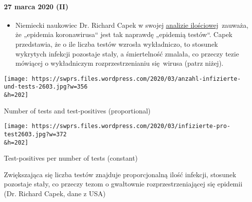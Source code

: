 \hypertarget{27-marca-2020-ii}{%
\paragraph{27 marca 2020 (II)}\label{27-marca-2020-ii}}

\begin{itemize}
\tightlist
\item
  Niemiecki naukowiec Dr. Richard Capek w swojej
  \href{https://coronadaten.wordpress.com/}{analizie
  ilościowej}~zauważa, że „epidemia koronawirusa`` jest tak naprawdę
  „epidemią testów``. Capek przedstawia, że o ile liczba testów wzrosła
  wykładniczo, to stosunek wykrytych infekcji pozostaje stały, a
  śmiertelność zmalała, co przeczy tezie mówiącej o wykładniczym
  rozprzestrzenianiu się~wirusa (patrz niżej).
\end{itemize}

\href{https://swprs.org/a-swiss-doctor-on-covid-19/anzahl-infizierte-und-tests-2603/}{}

\texttt{[image: https://swprs.files.wordpress.com/2020/03/anzahl-infizierte-und-tests-2603.jpg?w=356\\\&h=202]}

Number of tests and test-positives (proportional)

\href{https://swprs.org/covid-19-hinweis-ii/infizierte-pro-test2603/}{}

\texttt{[image: https://swprs.files.wordpress.com/2020/03/infizierte-pro-test2603.jpg?w=372\\\&h=202]}

Test-positives per number of tests (constant)

Zwiększająca się liczba testów znajduje proporcjonalną ilość infekcji,
stosunek pozostaje stały, co przeczy tezom o gwałtownie
rozprzestrzeniającej się epidemii (Dr. Richard Capek, dane z USA)

